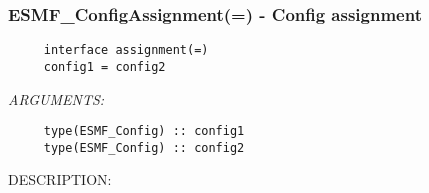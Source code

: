  
\setlength{\oldparskip}{\parskip}
\setlength{\parskip}{1.5ex}
\setlength{\oldparindent}{\parindent}
\setlength{\parindent}{0pt}
\setlength{\oldbaselineskip}{\baselineskip}
\setlength{\baselineskip}{11pt}
 
\def\bv{\begin{verbatim}}
\def\ev{\end{verbatim}}
\def\be{\begin{equation}}
\def\ee{\end{equation}}
\def\bea{\begin{eqnarray}}
\def\eea{\end{eqnarray}}
\def\bi{\begin{itemize}}
\def\ei{\end{itemize}}
\def\bn{\begin{enumerate}}
\def\en{\end{enumerate}}
\def\bd{\begin{description}}
\def\ed{\end{description}}
\def\({\left (}
\def\){\right )}
\def\[{\left [}
\def\]{\right ]}
\def\<{\left  \langle}
\def\>{\right \rangle}
\def\cI{{\cal I}}
\def\diag{\mathop{\rm diag}}
\def\tr{\mathop{\rm tr}}


 
\subsubsection [ESMF\_ConfigAssignment(=)] {ESMF\_ConfigAssignment(=) - Config assignment}


  
\begin{verbatim}     interface assignment(=)
     config1 = config2\end{verbatim}{\em ARGUMENTS:}
\begin{verbatim}     type(ESMF_Config) :: config1
     type(ESMF_Config) :: config2\end{verbatim}
{\sf DESCRIPTION:\\ }


